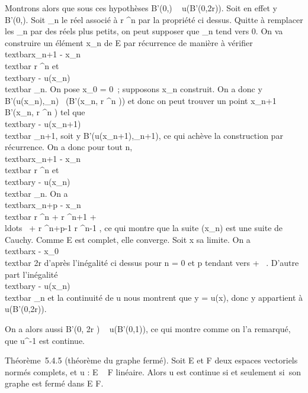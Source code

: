 \documentclass[]{article}
\begin{document}
Montrons alors que sous ces hypothèses B'(0,\rho) \subset~ u(B'(0,2r)). Soit en
effet y \in B'(0,\rho). Soit \rho\_n le réel associé à  r
^n par la propriété ci dessus. Quitte
à remplacer les \rho\_n par des réels plus petits, on peut supposer
que \rho\_n tend vers 0. On va construire un élément x\_n
de E par récurrence de manière à vérifier
\\textbar{}x\_n+1 -
x\_n\\textbar{} \leq r ^n et \\textbar{}y -
u(x\_n)\\textbar{} \leq \rho\_n. On pose
x\_0 = 0~; supposons x\_n construit. On a donc y \in
B'(u(x\_n),\rho\_n)
\subset~\overlineu(B'(x\_n, r ^n )) et donc on peut trouver un point x\_n+1 \in
B'(x\_n, r ^n ) tel que
\\textbar{}y -
u(x\_n+1)\\textbar{} \leq \rho\_n+1, soit y \in
B'(u(x\_n+1),\rho\_n+1), ce qui achève la construction par
récurrence. On a donc pour tout n,
\\textbar{}x\_n+1 -
x\_n\\textbar{} \leq r ^n et \\textbar{}y -
u(x\_n)\\textbar{} \leq \rho\_n. On a
\\textbar{}x\_n+p -
x\_n\\textbar{} \leq r ^n + r ^n+1 +
\\ldots~ + r
^n+p-1 \leq r ^n-1 , ce qui montre que la suite (x\_n) est une
suite de Cauchy. Comme E est complet, elle converge. Soit x sa limite.
On a \\textbar{}x -
x\_0\\textbar{} \leq 2r d'après l'inégalité ci
dessus pour n = 0 et p tendant vers + \infty~. D'autre part l'inégalité
\\textbar{}y - u(x\_n)\\textbar{}
\leq \rho\_n et la continuité de u nous montrent que y = u(x), donc y
appartient à u(B'(0,2r)).

On a alors aussi B'(0, \rho \over 2r ) \subset~ u(B'(0,1)), ce
qui montre comme on l'a remarqué, que u^-1 est continue.

Théorème~5.4.5 (théorème du graphe fermé). Soit E et F deux espaces
vectoriels normés complets, et u : E \rightarrow~ F linéaire. Alors u est continue
si et seulement si~son graphe est fermé dans E \times F.
\end{document}

